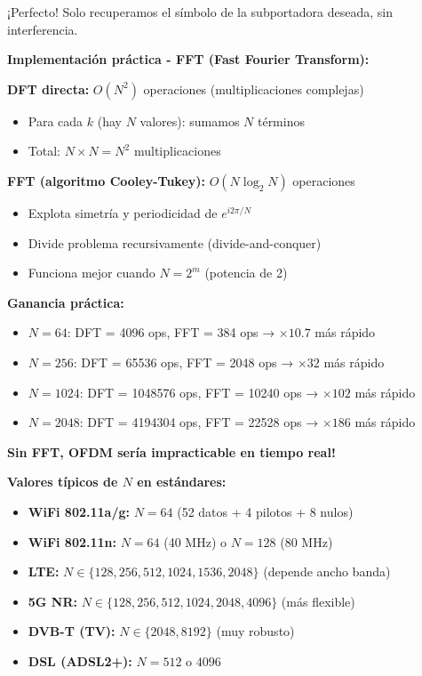 \documentclass[10pt,a4paper]{article}
\begin{document}
¡Perfecto! Solo recuperamos el símbolo de la subportadora deseada, sin interferencia.

\textbf{Implementación práctica - FFT (Fast Fourier Transform):}

\begin{tcolorbox}[colback=verdeclaro!10,colframe=verdeclaro,title=⚡ Eficiencia Computacional]
\textbf{DFT directa:} $O(N^2)$ operaciones (multiplicaciones complejas)
\begin{itemize}
\item Para cada $k$ (hay $N$ valores): sumamos $N$ términos
\item Total: $N \times N = N^2$ multiplicaciones
\end{itemize}

\textbf{FFT (algoritmo Cooley-Tukey):} $O(N\log_2 N)$ operaciones
\begin{itemize}
\item Explota simetría y periodicidad de $e^{i2\pi/N}$
\item Divide problema recursivamente (divide-and-conquer)
\item Funciona mejor cuando $N = 2^m$ (potencia de 2)
\end{itemize}

\textbf{Ganancia práctica:}
\begin{itemize}
\item $N=64$: DFT = 4096 ops, FFT = 384 ops → $\times 10.7$ más rápido
\item $N=256$: DFT = 65536 ops, FFT = 2048 ops → $\times 32$ más rápido
\item $N=1024$: DFT = 1048576 ops, FFT = 10240 ops → $\times 102$ más rápido
\item $N=2048$: DFT = 4194304 ops, FFT = 22528 ops → $\times 186$ más rápido
\end{itemize}

\textbf{Sin FFT, OFDM sería impracticable en tiempo real!}
\end{tcolorbox}

\textbf{Valores típicos de $N$ en estándares:}
\begin{itemize}
\item \textbf{WiFi 802.11a/g:} $N = 64$ (52 datos + 4 pilotos + 8 nulos)
\item \textbf{WiFi 802.11n:} $N = 64$ (40 MHz) o $N = 128$ (80 MHz)
\item \textbf{LTE:} $N \in \{128, 256, 512, 1024, 1536, 2048\}$ (depende ancho banda)
\item \textbf{5G NR:} $N \in \{128, 256, 512, 1024, 2048, 4096\}$ (más flexible)
\item \textbf{DVB-T (TV):} $N \in \{2048, 8192\}$ (muy robusto)
\item \textbf{DSL (ADSL2+):} $N = 512$ o $4096$
\end{itemize}
\end{document}
